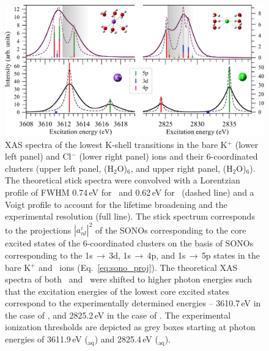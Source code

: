 \begin{figure}[h]
\centering
\includegraphics[scale=0.6]{figures/xas_spectra.eps}
\caption{
XAS spectra of the lowest K-shell transitions in the bare K$^{+}$ (lower left panel) and Cl$^{-}$ (lower right panel) ions and their 6-coordinated clusters (upper left panel, \ki(H$_2$O)$_6$, and upper right panel, \cli(H$_2$O)$_6$). The theoretical stick spectra were convolved with a Lorentzian profile of FWHM 0.74\,eV for \ki~and 0.62\,eV for \cli~(dashed line) and a Voigt profile to account for the lifetime broadening and the experimental resolution (full line). The stick spectrum corresponds to the projections $|a_{nl}^{i}|^2$ of the SONOs corresponding to the core excited states of the 6-coordinated clusters on the basis of SONOs corresponding to the 1s$\,\rightarrow\,$3d, 1s$\,\rightarrow\,$4p, and 1s$\,\rightarrow\,$5p states in the bare K$^+$ and \cli~ions (Eq.\ \ref{eq:sono_proj}). The theoretical XAS spectra of both \ki~and \cli~were shifted to higher photon energies such that the excitation energies of the lowest core excited states correspond to the experimentally determined energies -- 3610.7\,eV in the case of \ki, and 2825.2\,eV in the case of \cli. The experimental ionization thresholds are depicted as grey boxes starting at photon energies of 3611.9\,eV (\ki$_{\text{aq}}$) and 2825.4\,eV (\cli$_{\text{aq}}$).}
\label{fg:xas_kcl}
\end{figure}


